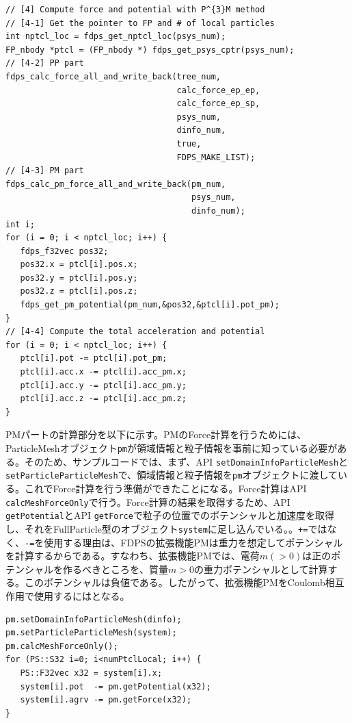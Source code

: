 \endifFtn
\ifC
\begin{lstlisting}[caption=相互作用計算の実行]
// [4] Compute force and potential with P^{3}M method
// [4-1] Get the pointer to FP and # of local particles
int nptcl_loc = fdps_get_nptcl_loc(psys_num);
FP_nbody *ptcl = (FP_nbody *) fdps_get_psys_cptr(psys_num);
// [4-2] PP part
fdps_calc_force_all_and_write_back(tree_num,
                                   calc_force_ep_ep,
                                   calc_force_ep_sp,
                                   psys_num,
                                   dinfo_num,
                                   true,
                                   FDPS_MAKE_LIST);
// [4-3] PM part
fdps_calc_pm_force_all_and_write_back(pm_num,
                                      psys_num,
                                      dinfo_num);
int i;
for (i = 0; i < nptcl_loc; i++) {
   fdps_f32vec pos32;
   pos32.x = ptcl[i].pos.x;
   pos32.y = ptcl[i].pos.y;
   pos32.z = ptcl[i].pos.z;
   fdps_get_pm_potential(pm_num,&pos32,&ptcl[i].pot_pm);
}
// [4-4] Compute the total acceleration and potential
for (i = 0; i < nptcl_loc; i++) {
   ptcl[i].pot -= ptcl[i].pot_pm;
   ptcl[i].acc.x -= ptcl[i].acc_pm.x;
   ptcl[i].acc.y -= ptcl[i].acc_pm.y;
   ptcl[i].acc.z -= ptcl[i].acc_pm.z;
}
\end{lstlisting}
\endifC
\ifCpp
PMパートの計算部分を以下に示す。PMのForce計算を行うためには、ParticleMeshオブジェクト\texttt{pm}が領域情報と粒子情報を事前に知っている必要がある。そのため、サンプルコードでは、まず、API \texttt{setDomainInfoParticleMesh}と\texttt{setParticleParticleMesh}で、領域情報と粒子情報を\texttt{pm}オブジェクトに渡している。これでForce計算を行う準備ができたことになる。Force計算はAPI \texttt{calcMeshForceOnly}で行う。Force計算の結果を取得するため、API \texttt{getPotential}とAPI \texttt{getForce}で粒子の位置でのポテンシャルと加速度を取得し、それをFullParticle型のオブジェクト\texttt{system}に足し込んでいる。\textbf{}。\texttt{+=}ではなく、\texttt{-=}を使用する理由は、FDPSの拡張機能PMは重力を想定してポテンシャルを計算するからである。すなわち、拡張機能PMでは、電荷$m(>0)$は正のポテンシャルを作るべきところを、質量$m>0$の重力ポテンシャルとして計算する。このポテンシャルは負値である。したがって、拡張機能PMをCoulomb相互作用で使用するには\textbf{}となる。
\begin{lstlisting}[caption=PMパートの計算]
pm.setDomainInfoParticleMesh(dinfo);
pm.setParticleParticleMesh(system);
pm.calcMeshForceOnly();
for (PS::S32 i=0; i<numPtclLocal; i++) {
   PS::F32vec x32 = system[i].x;
   system[i].pot  -= pm.getPotential(x32);
   system[i].agrv -= pm.getForce(x32);
}
\end{lstlisting}


